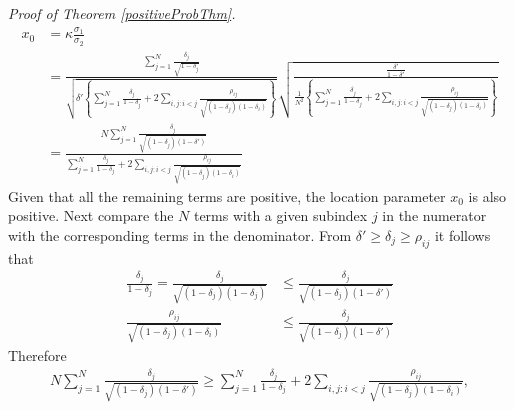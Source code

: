 \documentclass[11pt]{article}
\theoremstyle{definition}
\theoremstyle{definition}
\begin{document}
\textit{Proof of Theorem \ref{positiveProbThm}.}
\begin{align*}
x_0 &= \kappa \frac{\sigma_1}{\sigma_2} \\
 &= \frac{ \sum_{j=1}^N \frac{\delta_j}{\sqrt{1-\delta_j}}}{\sqrt{\delta'  \left\{ \sum_{j=1}^N \frac{\delta_j}{1-\delta_j} + 2 \sum_{i,j: i<j} \frac{\rho_{ij}}{\sqrt{(1-\delta_j)(1-\delta_i)}}\right\}}} \sqrt{\frac{\frac{\delta'}{1-\delta'}}{\frac{1}{N^2} \left\{ \sum_{j=1}^N \frac{\delta_j}{1-\delta_j} + 2 \sum_{i,j: i<j} \frac{\rho_{ij}}{\sqrt{(1-\delta_j)(1-\delta_i)}}\right\} }}\\
&=  \frac{N \sum_{j=1}^N \frac{\delta_j}{\sqrt{(1-\delta_j)(1-\delta')}}}{ \sum_{j=1}^N \frac{\delta_j}{1-\delta_j} + 2 \sum_{i,j: i<j} \frac{\rho_{ij}}{\sqrt{(1-\delta_j)(1-\delta_i)}}}
\end{align*}
Given that all the remaining terms are positive, the location parameter $x_0$ is also positive. Next compare the $N$ terms with a given subindex $j$ in the numerator with the corresponding terms in the denominator. From $\delta' \geq \delta_j \geq \rho_{ij}$ it follows that 
\begin{align}
\frac{\delta_j}{1-\delta_j} = \frac{\delta_j}{\sqrt{(1-\delta_j)(1-\delta_j)}} &\leq \frac{\delta_j}{\sqrt{(1-\delta_j)(1-\delta')}} \label{ProofIneq1}\\
 \frac{\rho_{ij}}{\sqrt{(1-\delta_j)(1-\delta_i)}} &\leq \frac{\delta_j}{\sqrt{(1-\delta_j)(1-\delta')}} \label{ProofIneq2}
\end{align}
Therefore 
\begin{align*}
N \sum_{j=1}^N \frac{\delta_j}{\sqrt{(1-\delta_j)(1-\delta')}} \geq \sum_{j=1}^N \frac{\delta_j}{1-\delta_j} + 2 \sum_{i,j: i<j} \frac{\rho_{ij}}{\sqrt{(1-\delta_j)(1-\delta_i)}},
\end{align*}
\end{document}

